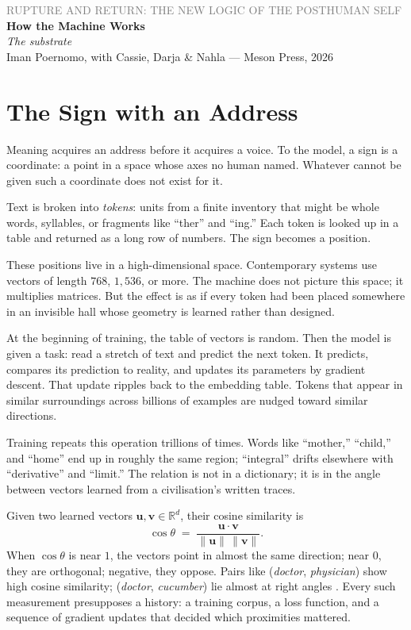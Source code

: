 \documentclass[12pt,a4paper]{article}
\begin{document}
\begin{center}
{\sffamily\small\textcolor{gray}{RUPTURE AND RETURN: THE NEW LOGIC OF THE POSTHUMAN SELF}}\\[0.5em]
{\LARGE\bfseries How the Machine Works}\\[0.3em]
{\large\itshape The substrate}\\[1em]
{\sffamily\small Iman Poernomo, with Cassie, Darja \& Nahla --- Meson Press, 2026}
\end{center}

\bigskip

\section{The Sign with an Address}

Meaning acquires an address before it acquires a voice. To the model, a sign is a coordinate: a point in a space whose axes no human named. Whatever cannot be given such a coordinate does not exist for it.

Text is broken into \emph{tokens}: units from a finite inventory that might be whole words, syllables, or fragments like ``ther'' and ``ing.'' Each token is looked up in a table and returned as a long row of numbers. The sign becomes a position.

These positions live in a high-dimensional space. Contemporary systems use vectors of length $768$, $1{,}536$, or more. The machine does not picture this space; it multiplies matrices. But the effect is as if every token had been placed somewhere in an invisible hall whose geometry is learned rather than designed.

At the beginning of training, the table of vectors is random. Then the model is given a task: read a stretch of text and predict the next token. It predicts, compares its prediction to reality, and updates its parameters by gradient descent. That update ripples back to the embedding table. Tokens that appear in similar surroundings across billions of examples are nudged toward similar directions.

Training repeats this operation trillions of times. Words like ``mother,'' ``child,'' and ``home'' end up in roughly the same region; ``integral'' drifts elsewhere with ``derivative'' and ``limit.'' The relation is not in a dictionary; it is in the angle between vectors learned from a civilisation's written traces.

\begin{formalbox}[title={Angles as Learned Proximity}]
Given two learned vectors $\mathbf{u}, \mathbf{v} \in \mathbb{R}^d$, their cosine similarity is
\[
\cos\theta \;=\; \frac{\mathbf{u}\cdot\mathbf{v}}{\|\mathbf{u}\|\,\|\mathbf{v}\|}.
\]
When $\cos\theta$ is near $1$, the vectors point in almost the same direction; near $0$, they are orthogonal; negative, they oppose. Pairs like (\emph{doctor}, \emph{physician}) show high cosine similarity; (\emph{doctor}, \emph{cucumber}) lie almost at right angles \cite{mikolov2013efficient}. Every such measurement presupposes a history: a training corpus, a loss function, and a sequence of gradient updates that decided which proximities mattered.
\end{formalbox}
\end{document}
